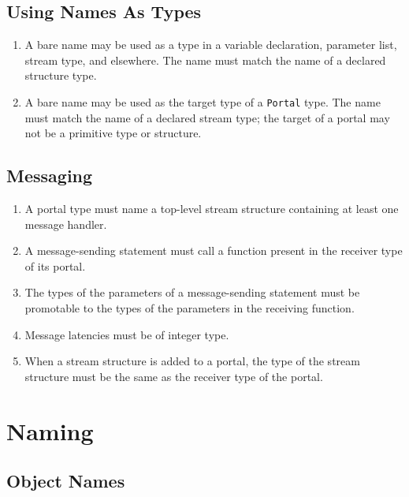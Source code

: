 \documentclass[11pt]{article}
\begin{document}
\subsection{Using Names As Types}

\begin{enumerate}
\item A bare name may be used as a type in a variable declaration,
  parameter list, stream type, and elsewhere.  The name must match the
  name of a declared structure type.
\item A bare name may be used as the target type of a
  \lstinline|Portal| type.  The name must match the name of a declared
  stream type; the target of a portal may not be a primitive type or
  structure.
\end{enumerate}

\subsection{Messaging}

\begin{enumerate}
\item A portal type must name a top-level stream structure containing
  at least one message handler.
\item A message-sending statement must call a function present in the
  receiver type of its portal.
\item The types of the parameters of a message-sending statement must
  be promotable to the types of the parameters in the receiving
  function.
\item Message latencies must be of integer type.
\item When a stream structure is added to a portal, the type of the
  stream structure must be the same as the receiver type of the
  portal.
\end{enumerate}

\section{Naming}

\subsection{Object Names}
\end{document}
